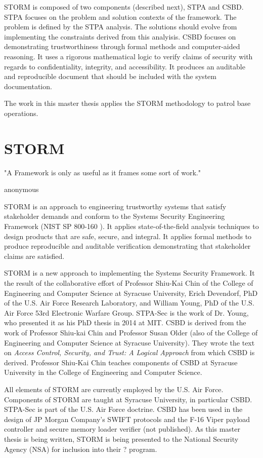 \documentclass[../../main/main.tex]{subfiles}
\begin{document}
STORM is composed of two components (described next), STPA and CSBD.  STPA focuses on the problem and solution contexts of the framework.  The problem is defined by the STPA analysis.  The solutions should evolve from implementing the constraints derived from this analyisis. CSBD focuses on demonstrating trustworthiness through formal methods and computer-aided reasoning.  It uses a rigorous mathematical logic to verify claims of security with regards to confidentiality, integrity, and accessibility.  It produces an auditable and reproducible document that should be included with the system documentation.

The work in this master thesis applies the STORM methodology to patrol base operations. 


\section{STORM}\label{sec:storm}
"A Framework is only as useful as it frames some sort of work."

anonymous

STORM is an approach to engineering trustworthy systems that satisfy stakeholder demands and conform to the Systems Security Engineering Framework (NIST SP 800-160 \cite{}).  It applies state-of-the-field analysis techniques to design products that are safe, secure, and integral.  It applies formal methods to produce reproducible and auditable verification demonstrating that stakeholder claims are satisfied.


STORM is a new approach to implementing the Systems Security Framework.  It the result of the collaborative effort of Professor Shiu-Kai Chin of the College of Engineering and Computer Science at Syracuse University, Erich Devendorf, PhD of the U.S. Air Force Research Laboratory, and William Young, PhD of the U.S. Air Force 53rd Electronic Warfare Group.  STPA-Sec is the work of Dr. Young, who presented it as his PhD thesis in 2014 at MIT.  CSBD is derived from the work of Professor Shiu-kai Chin and Professor Susan Older (also of the College of Engineering and Computer Science at Syracuse University).  They wrote the text on \textit{Access Control, Security, and Trust: A Logical Approach} \cite{csbd} from which CSBD is derived.  Professor Shiu-Kai Chin teaches components of CSBD at Syracuse University in the College of Engineering and Computer Science.  


All elements of STORM are currently employed by the U.S. Air Force.  Components of STORM are taught at Syracuse University, in particular CSBD.  STPA-Sec is part of the U.S. Air Force doctrine.  CSBD has been used in the design of JP Morgan Company's SWIFT protocols \cite{} and the F-16 Viper payload controller and secure memory loader verifier (not published). As this master thesis is being written, STORM is being presented to the National Security Agency (NSA) for inclusion into their ? program.
\end{document}
